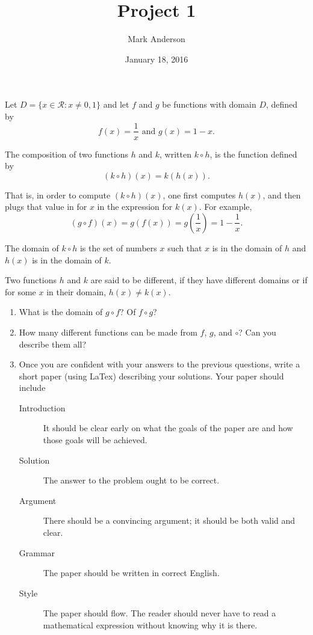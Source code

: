 \documentclass[11pt]{amsart}
\title{Project 1}
\author{Mark Anderson}
\date{January 18, 2016}
\begin{document}
\maketitle

Let  $D=\{ x \in \mathcal{R} : x \neq 0,1\}$ and let $f$  and $g$ be functions with domain $D$, defined by
$$f(x)= \frac{1}{x} \text{  and }   g(x)=1- x.$$  

The composition of two functions $h$ and $k$, written $k \circ h$,  is the function defined by
 $$(k \circ h)(x)=k\left(h(x)\right).$$

That is, in order to compute  $(k \circ h)(x)$, one first computes $h(x)$,  and then plugs that value in for $x$ in the expression for $k(x)$.  For example,  
$$(g \circ f)(x)=g\left(f(x)\right)=g\left(\frac{1}{x}\right)=1-\frac{1}{x}.$$  

The domain of $k \circ h$ is the set of numbers $x$ such that $x$ is in the domain of $h$ and $h(x)$ is in the domain of $k$.

Two functions $h$ and $k$ are said to be different, if they have different domains or if for some $x$ in their domain, $h(x) \neq k(x)$.  

\begin{enumerate}
\item What is the domain of $g \circ f$?  Of $f \circ g$?

\item How many different functions can be made from $f$, $g$, and $\circ$?  Can you describe them all?

\item Once you are confident with your answers to the previous questions, write a short paper (using LaTex) describing your solutions. Your paper should include
\begin{description}
\item [Introduction]  It should be clear early on what the goals of the paper are and how those goals will be achieved.

\item	[Solution] The answer to the problem ought to be correct.

\item	[Argument]  There should be a convincing argument; it should be both valid and clear.

\item [Grammar]  The paper should be written in correct English.

\item [Style]  The paper should flow.  The reader should never have to read a mathematical expression without knowing why it is there.
\end{description}

\end{enumerate}
\end{document}
